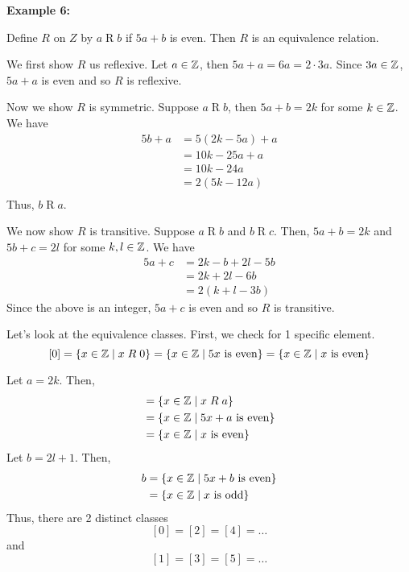 \documentclass{article}
\begin{document}
\begin{examples}
    \textbf{Example 6:}

    Define $R$ on $Z$ by $a \mathrel{R} b$ if $5a+b$ is even.
    Then $R$ is an equivalence relation.

    We first show $R$ us reflexive.
    Let $a \in \mathbb{Z}$, then $5a + a = 6a = 2 \cdot 3a$. Since $3a \in \mathbb{Z}$, $5a + a$ is even and so $R$ is reflexive.

    Now we show $R$ is symmetric.
    Suppose $a \mathrel{R} b$, then $5a + b = 2k$ for some $k \in \mathbb{Z}$.
    We have
    \begin{align*}
      5b + a &= 5(2k - 5a) + a\\
      &= 10k - 25a + a\\
      &= 10k - 24a\\
      &= 2(5k-12a)\\
    \end{align*}
    Thus, $b \mathrel{R} a$.

    We now show $R$ is transitive.
    Suppose $a \mathrel{R} b$ and $b \mathrel{R} c$.
    Then, $5a + b = 2k$ and $5b + c = 2l$ for some $k, l \in \mathbb{Z}$.
    We have
    \begin{align*}
      5a + c &= 2k-b + 2l - 5b\\
      &= 2k + 2l - 6b\\
      &= 2(k+l-3b)
    \end{align*}
    Since the above is an integer, $5a + c$ is even and so $R$ is transitive.

    Let's look at the equivalence classes. First, we check for 1 specific element.
    \[
      [0] = \{x \in \mathbb{Z} \mid x \mathrel{R} 0\} = \{x \in \mathbb{Z} \mid 5x \text{ is even}\} = \{x \in \mathbb{Z} \mid x \text{ is even}\}
    \]

    Let $a = 2k$. Then,
    \begin{align*}
      [a] &= \{x \in \Z \mid x \mathrel{R} a\}\\
      &= \{x \in \Z \mid 5x + a \text{ is even}\}\\
      &= \{x\in \Z \mid x \text{ is even}\}
    \end{align*}
    Let $b = 2l + 1$. Then,
    \begin{align*}
      b &= \{x\in \mathbb{Z} \mid 5x + b \text{ is even}\}\\
      &= \{x \in \mathbb{Z} \mid x \text{ is odd}\}\\
    \end{align*}
    Thus, there are 2 distinct classes
    \[
      [0] = [2] = [4] = \dots
    \]
    and \[
      [1] = [3] = [5] = \dots
    \]
  \end{examples}
\end{document}

